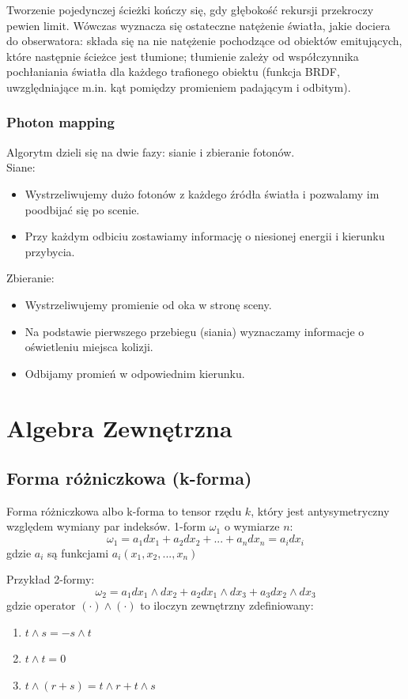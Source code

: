 \documentclass[12pt]{article}
\begin{document}
Tworzenie pojedynczej ścieżki kończy się, gdy głębokość rekursji przekroczy pewien limit. Wówczas wyznacza się ostateczne natężenie światła, jakie dociera do obserwatora: składa się na nie natężenie pochodzące od obiektów emitujących, które następnie ścieżce jest tłumione; tłumienie zależy od współczynnika pochłaniania światła dla każdego trafionego obiektu (funkcja BRDF, uwzględniające m.in. kąt pomiędzy promieniem padającym i odbitym).

\subsubsection{Photon mapping}
Algorytm dzieli się na dwie fazy: sianie i zbieranie fotonów.\\
Siane:
\begin{itemize}
	\item Wystrzeliwujemy dużo fotonów z każdego źródła światła i pozwalamy im poodbijać się po scenie.
	\item Przy każdym odbiciu zostawiamy informację o niesionej energii i kierunku przybycia.
\end{itemize}
Zbieranie:
\begin{itemize}
	\item Wystrzeliwujemy promienie od oka w stronę sceny.
	\item Na podstawie pierwszego przebiegu (siania) wyznaczamy informacje o oświetleniu miejsca kolizji.
	\item Odbijamy promień w odpowiednim kierunku.
\end{itemize}

\section{Algebra Zewnętrzna}

\subsection{Forma różniczkowa (k-forma)}
Forma różniczkowa albo k-forma to tensor rzędu $k$, który jest antysymetryczny względem wymiany par indeksów. 1-form $\omega_{1}$ o wymiarze $n$:
\begin{equation}
\omega_{1} = a_{1} dx_{1} + a_{2} dx_{2} + ... + a_{n} dx_{n} = a_{i} dx_{i}
\end{equation}
gdzie $a_{i}$ są funkcjami $a_{i}(x_{1}, x_{2}, ..., x_{n})$

Przykład 2-formy:
\begin{equation}
\omega_{2} = a_{1} dx_{1} \wedge dx_{2} + a_{2} dx_{1} \wedge dx_{3} + a_{3} dx_{2} \wedge dx_{3}
\end{equation}
gdzie operator $(\cdot) \wedge (\cdot)$ to iloczyn zewnętrzny zdefiniowany:
\begin{enumerate}
\item $t \wedge s = - s \wedge t$
\item $t \wedge t = 0$
\item $t \wedge (r + s) = t \wedge r + t \wedge s$
\end{enumerate}
\end{document}

